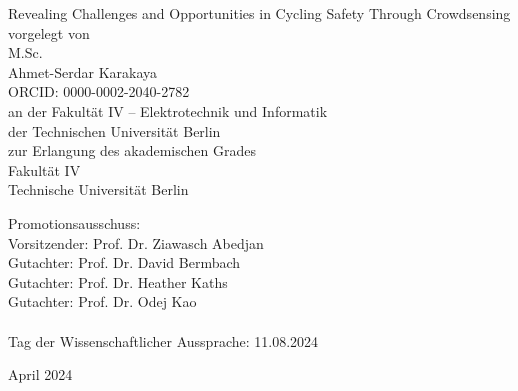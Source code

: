 
\thispagestyle{empty}
\begin{center}
    \huge{Revealing Challenges and Opportunities in Cycling Safety Through Crowdsensing}\\[2pc]
    
    \large{vorgelegt von}\\
    \large{M.Sc.}\\
    \large{Ahmet-Serdar Karakaya}\\
    \large{ORCID: 0000-0002-2040-2782}\\[2pc]


    an der Fakultät IV – Elektrotechnik und Informatik\\
    der Technischen Universität Berlin\\
    zur Erlangung des akademischen Grades\\
    Fakultät IV\\
    Technische Universität Berlin
\end{center}
Promotionsausschuss:\\
Vorsitzender: Prof. Dr. Ziawasch Abedjan\\
Gutachter: Prof. Dr. David Bermbach\\
Gutachter: Prof. Dr. Heather Kaths\\
Gutachter: Prof. Dr. Odej Kao\\
\\
Tag der Wissenschaftlicher Aussprache: 11.08.2024\\
\begin{center}
April 2024
\end{center}

\afterpage{\null\thispagestyle{empty}\newpage}

